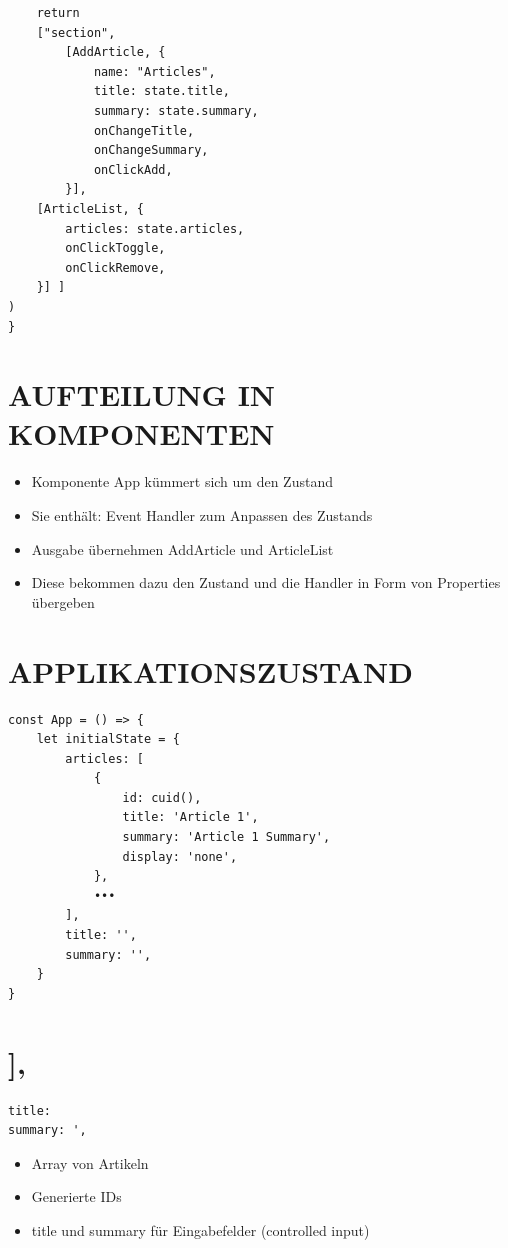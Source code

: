 \documentclass[10pt]{article}
\begin{document}
\begin{verbatim}
    return
    ["section",
        [AddArticle, {
            name: "Articles",
            title: state.title,
            summary: state.summary,
            onChangeTitle,
            onChangeSummary,
            onClickAdd,
        }],
    [ArticleList, {
        articles: state.articles,
        onClickToggle,
        onClickRemove,
    }] ]
)
}
\end{verbatim}

\section*{AUFTEILUNG IN KOMPONENTEN}
\begin{itemize}
  \item Komponente App kümmert sich um den Zustand
  \item Sie enthält: Event Handler zum Anpassen des Zustands
  \item Ausgabe übernehmen AddArticle und ArticleList
  \item Diese bekommen dazu den Zustand und die Handler in Form von Properties übergeben
\end{itemize}

\section*{APPLIKATIONSZUSTAND}
\begin{verbatim}
const App = () => {
    let initialState = {
        articles: [
            {
                id: cuid(),
                title: 'Article 1',
                summary: 'Article 1 Summary',
                display: 'none',
            },
            •••
        ],
        title: '',
        summary: '',
    }
}
\end{verbatim}

\section*{],}
\begin{verbatim}
title:
summary: ',
\end{verbatim}

\begin{itemize}
  \item Array von Artikeln
  \item Generierte IDs
  \item title und summary für Eingabefelder (controlled input)
\end{itemize}
\end{document}
